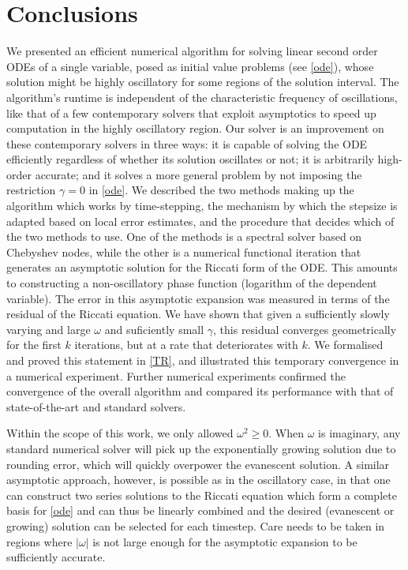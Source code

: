 \documentclass[10pt]{article}
\newcommand{\om}{\omega}
\newcommand{\g}{\gamma}
\begin{document}
\section{Conclusions \label{conclusions}}

We presented an efficient numerical algorithm for solving linear second order
ODEs of a single variable, posed as initial value problems (see \cref{ode}), whose solution
might be highly oscillatory for some regions of the solution interval.
The
algorithm's runtime is independent of the characteristic frequency of
oscillations, like that of a few contemporary solvers that exploit asymptotics to speed up computation in the highly oscillatory region.
Our solver is an improvement on these contemporary solvers
in three ways: it is capable of solving the ODE efficiently regardless of
whether its solution oscillates or not; it is arbitrarily high-order accurate;
and it solves a more general problem by not imposing the restriction $\gamma =
0$ in \cref{ode}. 
We described the two methods making up the algorithm which works by
time-stepping, the mechanism by which the stepsize is adapted based on local
error estimates, and the procedure that decides which of the two methods to
use. One of the methods is a spectral solver based on Chebyshev nodes, while
the other is a numerical functional iteration that generates an asymptotic
solution for the Riccati form of the ODE. This amounts to constructing a
non-oscillatory phase function (logarithm of the dependent
variable). The error in this asymptotic expansion was measured in terms of the
residual of the Riccati equation. We have shown that given a sufficiently
slowly varying and large $\om$ and suficiently small $\g$, this residual
converges geometrically for the first $k$ iterations, but at a rate that
deteriorates with $k$. We formalised and proved this statement in \cref{TR},
and illustrated this temporary convergence in a numerical experiment. Further
numerical experiments confirmed the convergence of the overall algorithm and
compared its performance with that of state-of-the-art and standard solvers.

Within the scope of this work, we only allowed $\om^2 \geq 0$. When $\om$ is
imaginary, any standard numerical solver will pick up the exponentially growing
solution due to rounding error, which will quickly overpower the evanescent
solution. A similar asymptotic approach, however, is possible as in the
oscillatory case, in that one can construct two series solutions to the Riccati
equation which form a complete basis for \cref{ode} and can thus be linearly
combined and the desired (evanescent or growing) solution can be selected for
each timestep. Care needs to be taken in regions where $|\om|$ is not large
enough for the asymptotic expansion to be sufficiently accurate.
\end{document}
